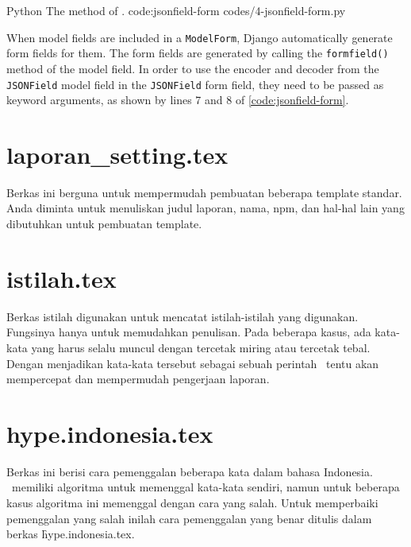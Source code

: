\listing
{Python}
{The  method of .}
{code:jsonfield-form}
{codes/4-jsonfield-form.py}

When model fields are included in a \verb|ModelForm|, Django automatically
generate form fields for them. The form fields are generated by calling the
\verb|formfield()| method of the model field. In order to use the encoder and
decoder from the \verb|JSONField| model field in the \verb|JSONField| form
field, they need to be passed as keyword arguments, as shown by lines 7 and 8
of \autoref{code:jsonfield-form}.

\section{laporan\_setting.tex}
Berkas ini berguna untuk mempermudah pembuatan beberapa template standar.
Anda diminta untuk menuliskan judul laporan, nama, npm, dan hal-hal lain yang dibutuhkan untuk pembuatan template.


\section{istilah.tex}
Berkas istilah digunakan untuk mencatat istilah-istilah yang digunakan.
Fungsinya hanya untuk memudahkan penulisan.
Pada beberapa kasus, ada kata-kata yang harus selalu muncul dengan tercetak miring atau tercetak tebal.
Dengan menjadikan kata-kata tersebut sebagai sebuah perintah \latex~tentu akan mempercepat dan mempermudah pengerjaan laporan.


\section{hype.indonesia.tex}
Berkas ini berisi cara pemenggalan beberapa kata dalam bahasa Indonesia.
\latex~memiliki algoritma untuk memenggal kata-kata sendiri, namun untuk beberapa kasus algoritma ini memenggal dengan cara yang salah.
Untuk memperbaiki pemenggalan yang salah inilah cara pemenggalan yang benar ditulis dalam berkas \f{hype.indonesia.tex}.


